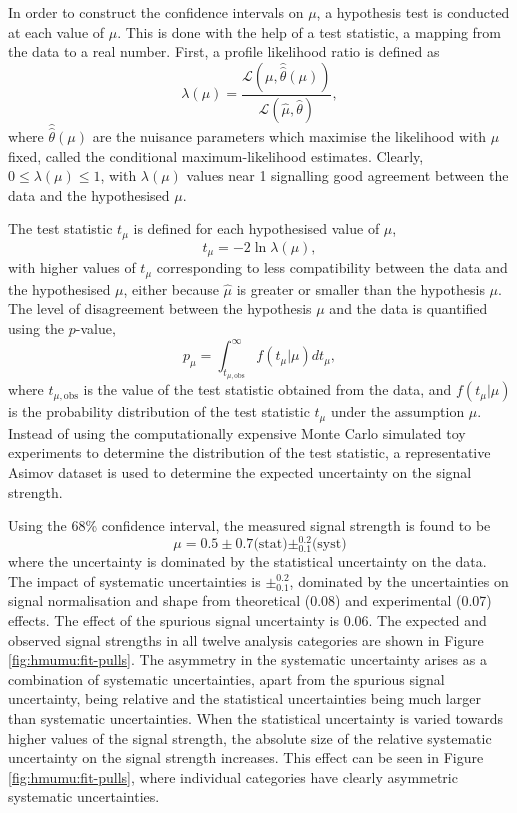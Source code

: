 In order to construct the confidence intervals on $\mu$, a hypothesis
test is conducted at each value of $\mu$. This is done with the help
of a test statistic, a mapping from the data to a real number.
First, a profile likelihood ratio is defined as
\begin{equation}
\lambda(\mu) =
\frac{\mathcal{L}(\mu, \hat{\hat\theta}(\mu))}
     {\mathcal{L}(\hat\mu, \hat\theta)},
\end{equation}
where $\hat{\hat\theta}(\mu)$ are the nuisance parameters which maximise
the likelihood with $\mu$ fixed, called the conditional maximum-likelihood
estimates. Clearly, $0 \leq \lambda(\mu) \leq 1$, with $\lambda(\mu)$
values near 1 signalling good agreement between the data and the
hypothesised $\mu$.

The test statistic $t_\mu$ is defined for each hypothesised value of
$\mu$,
\begin{equation}
t_\mu = -2\ln\lambda(\mu),
\end{equation}
with higher values of $t_\mu$ corresponding to less compatibility
between the data and the hypothesised $\mu$, either because
$\hat\mu$ is greater or smaller than the hypothesis $\mu$.
The level of disagreement between the hypothesis $\mu$ and the
data is quantified using the $p$-value,
\begin{equation}
p_\mu = \int_{t_{\mu, \text{obs}}}^{\infty} f(t_\mu|\mu) dt_\mu,
\end{equation}
where $t_{\mu, \text{obs}}$ is the value of the test statistic
obtained from the data, and $f(t_\mu|\mu)$ is the probability
distribution of the test statistic $t_\mu$ under the
assumption $\mu$. Instead of using the computationally expensive
Monte Carlo simulated toy experiments to determine the distribution
of the test statistic, a representative Asimov dataset \cite{Cowan:2010js} is
used to determine the expected uncertainty on the signal strength.

Using the 68\% confidence interval, the
measured signal strength is found to be
\begin{equation}
\mu = 0.5 \pm 0.7 \text{(stat)} \pm^{0.2}_{0.1} \text{(syst)}
\end {equation}
where the uncertainty is dominated by the statistical uncertainty on the
data. The impact of systematic uncertainties is $\pm^{0.2}_{0.1}$,
dominated by the uncertainties on signal normalisation and shape
from theoretical (0.08) and experimental (0.07) effects. The effect
of the spurious signal uncertainty is 0.06. The expected and observed signal
strengths in all twelve analysis categories are shown in Figure
\ref{fig:hmumu:fit-pulls}.
The asymmetry in the systematic uncertainty
arises as a combination of systematic uncertainties, apart from the
spurious signal uncertainty, being relative
and the statistical uncertainties being much larger than systematic
uncertainties. When the statistical uncertainty is varied towards higher
values of the signal strength, the absolute size of the relative
systematic uncertainty on the signal strength increases. This effect can
be seen in Figure \ref{fig:hmumu:fit-pulls}, where individual categories
have clearly asymmetric systematic uncertainties.

